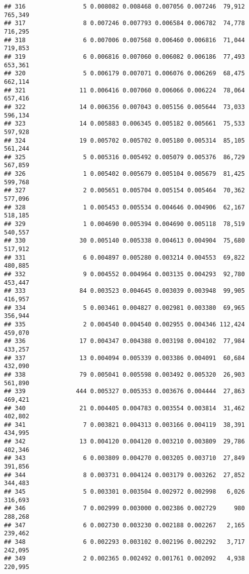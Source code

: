 \documentclass[]{article}
\begin{document}
\begin{verbatim}
## 316                5 0.008082 0.008468 0.007056 0.007246  79,912   765,349
## 317                8 0.007246 0.007793 0.006584 0.006782  74,778   716,295
## 318                6 0.007006 0.007568 0.006460 0.006816  71,044   719,853
## 319                6 0.006816 0.007060 0.006082 0.006186  77,493   653,361
## 320                5 0.006179 0.007071 0.006076 0.006269  68,475   662,114
## 321               11 0.006416 0.007060 0.006066 0.006224  78,064   657,416
## 322               14 0.006356 0.007043 0.005156 0.005644  73,033   596,134
## 323               14 0.005883 0.006345 0.005182 0.005661  75,533   597,928
## 324               19 0.005702 0.005702 0.005180 0.005314  85,105   561,244
## 325                5 0.005316 0.005492 0.005079 0.005376  86,729   567,859
## 326                1 0.005402 0.005679 0.005104 0.005679  81,425   599,768
## 327                2 0.005651 0.005704 0.005154 0.005464  70,362   577,096
## 328                1 0.005453 0.005534 0.004646 0.004906  62,167   518,185
## 329                1 0.004690 0.005394 0.004690 0.005118  78,519   540,557
## 330               30 0.005140 0.005338 0.004613 0.004904  75,680   517,912
## 331                6 0.004897 0.005280 0.003214 0.004553  69,822   480,885
## 332                9 0.004552 0.004964 0.003135 0.004293  92,780   453,447
## 333               84 0.003523 0.004645 0.003039 0.003948  99,905   416,957
## 334                5 0.003461 0.004827 0.002981 0.003380  69,965   356,944
## 335                2 0.004540 0.004540 0.002955 0.004346 112,424   459,070
## 336               17 0.004347 0.004388 0.003198 0.004102  77,984   433,257
## 337               13 0.004094 0.005339 0.003386 0.004091  60,684   432,090
## 338               79 0.005041 0.005598 0.003492 0.005320  26,903   561,890
## 339              444 0.005327 0.005353 0.003676 0.004444  27,863   469,421
## 340               21 0.004405 0.004783 0.003554 0.003814  31,462   402,802
## 341                7 0.003821 0.004313 0.003166 0.004119  38,391   434,995
## 342               13 0.004120 0.004120 0.003210 0.003809  29,786   402,346
## 343                6 0.003809 0.004270 0.003205 0.003710  27,849   391,856
## 344                8 0.003731 0.004124 0.003179 0.003262  27,852   344,483
## 345                5 0.003301 0.003504 0.002972 0.002998   6,026   316,693
## 346                7 0.002999 0.003000 0.002386 0.002729     980   288,268
## 347                6 0.002730 0.003230 0.002188 0.002267   2,165   239,462
## 348                6 0.002293 0.003102 0.002196 0.002292   3,717   242,095
## 349                2 0.002365 0.002492 0.001761 0.002092   4,938   220,995

\end{verbatim}
\end{document}
